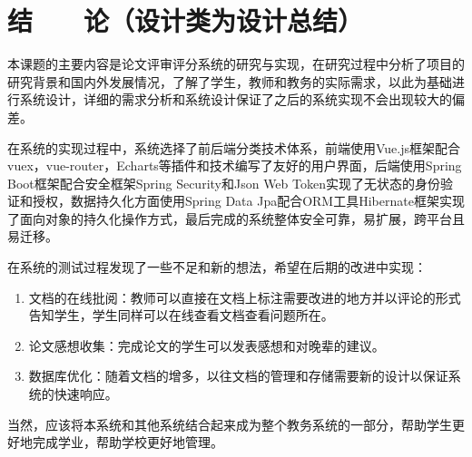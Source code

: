 
\chapter*{\hfill 结　　论（设计类为设计总结） \hfill}
\label{conclusion}

本课题的主要内容是论文评审评分系统的研究与实现，在研究过程中分析了项目的研究背景和国内外发展情况，了解了学生，教师和教务的实际需求，以此为基础进行系统设计，详细的需求分析和系统设计保证了之后的系统实现不会出现较大的偏差。

在系统的实现过程中，系统选择了前后端分类技术体系，前端使用Vue.js框架配合vuex，vue-router，Echarts等插件和技术编写了友好的用户界面，后端使用Spring Boot框架配合安全框架Spring Security和Json Web Token实现了无状态的身份验证和授权，数据持久化方面使用Spring Data Jpa配合ORM工具Hibernate框架实现了面向对象的持久化操作方式，最后完成的系统整体安全可靠，易扩展，跨平台且易迁移。

在系统的测试过程发现了一些不足和新的想法，希望在后期的改进中实现：
\begin{enumerate}
    \item 文档的在线批阅：教师可以直接在文档上标注需要改进的地方并以评论的形式告知学生，学生同样可以在线查看文档查看问题所在。
    \item 论文感想收集：完成论文的学生可以发表感想和对晚辈的建议。
    \item 数据库优化：随着文档的增多，以往文档的管理和存储需要新的设计以保证系统的快速响应。
\end{enumerate}

当然，应该将本系统和其他系统结合起来成为整个教务系统的一部分，帮助学生更好地完成学业，帮助学校更好地管理。